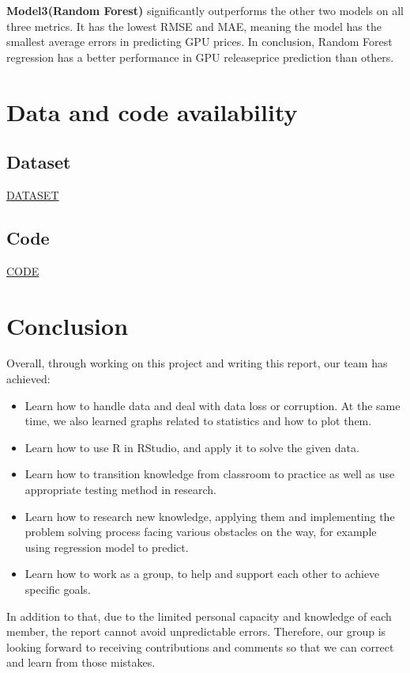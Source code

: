\documentclass[a4paper]{article}
\theoremstyle{definition}
\begin{document}
\textbf{Model3(Random Forest)} significantly outperforms the other two models on all three metrics. It has the lowest RMSE and MAE, meaning the model has the smallest average errors in predicting GPU prices. In conclusion, Random Forest regression has a better performance in GPU release\textunderscore price prediction than others.
\section{Data and code availability}
\subsection{Dataset}
\href{https://www.kaggle.com/datasets/iliassekkaf/computerparts/data?select=All_GPUs.csv}{DATASET}
\subsection{Code}
\href{https://github.com/NhtJm/GR09-03}{CODE}
\section{Conclusion}
Overall, through working on this project and writing this report, our team has achieved:
\begin{itemize}
    \item Learn how to handle data and deal with data loss or corruption. At the same time, we also learned graphs related to statistics and how to plot them.
    \item Learn how to use R in RStudio, and apply it to solve the given data. 
    \item Learn how to transition knowledge from classroom to practice as well as use appropriate testing method in research.
    \item Learn how to research new knowledge, applying them and implementing the problem solving process facing various obstacles on the way, for example using regression model to predict.
    \item Learn how to work as a group, to help and support each other to achieve specific goals.
\end{itemize}
In addition to that, due to the limited personal capacity and knowledge of each member, the report cannot avoid unpredictable errors. Therefore, our group is looking forward to receiving contributions and comments so that we can correct and learn from those mistakes.
\pagebreak
\end{document}
